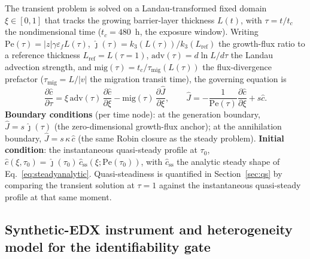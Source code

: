 The transient problem is solved on a Landau-transformed fixed domain
$\xi \in [0,1]$ that tracks the growing barrier-layer thickness $L(t)$,
with $\tau = t/t_c$ the nondimensional time ($t_c = 480$~h, the exposure
window). Writing $\mathrm{Pe}(\tau) = |z|\gamma\varepsilon_f L(\tau)$,
$\hat{\jmath}(\tau) = k_3(L(\tau))/k_3(L_\text{ref})$ the growth-flux
ratio to a reference thickness $L_\text{ref} = L(\tau{=}1)$,
$\mathrm{adv}(\tau) = d\ln L/d\tau$ the Landau advection strength, and
$\mathrm{mig}(\tau) = t_c/\tau_\text{mig}(L(\tau))$ the flux-divergence
prefactor ($\tau_\text{mig} = L/|v|$ the migration transit time), the
governing equation is
\begin{equation}
\frac{\partial \hat{c}}{\partial \tau}
= \xi\,\mathrm{adv}(\tau)\,\frac{\partial \hat{c}}{\partial \xi}
- \mathrm{mig}(\tau)\,\frac{\partial \hat{J}}{\partial \xi},
\qquad
\hat{J} = -\frac{1}{\mathrm{Pe}(\tau)}\frac{\partial \hat{c}}{\partial \xi} + s\hat{c}.
\label{eq:transientpde}
\end{equation}
\textbf{Boundary conditions} (per time node): at the generation
boundary, $\hat{J} = s\,\hat{\jmath}(\tau)$ (the zero-dimensional
growth-flux anchor); at the annihilation boundary,
$\hat{J} = s\,\kappa\,\hat{c}$ (the same Robin closure as the steady
problem). \textbf{Initial condition}: the instantaneous quasi-steady
profile at $\tau_0$, $\hat{c}(\xi, \tau_0) = \hat{\jmath}(\tau_0)\,\hat{c}_\text{ss}(\xi;\mathrm{Pe}(\tau_0))$,
with $\hat{c}_\text{ss}$ the analytic steady shape of
Eq.~\eqref{eq:steadyanalytic}. Quasi-steadiness is quantified in
Section~\ref{sec:qs} by comparing the transient solution at $\tau=1$
against the instantaneous quasi-steady profile at that same moment.

\subsection{Synthetic-EDX instrument and heterogeneity model for the
identifiability gate}
\label{sec:instrument}

